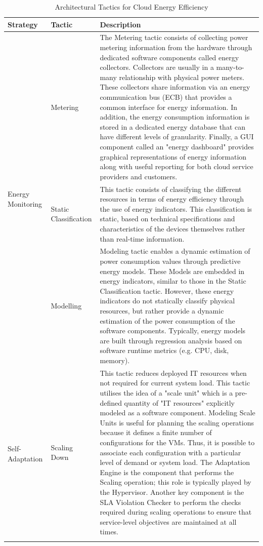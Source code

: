 \begin{small}
\begin{longtable}{| l | l | p{8cm} |}
\caption{Architectural Tactics for Cloud Energy Efficiency}
\label{table:cloudtactics}\\
\hline

\textbf{Strategy} & \textbf{Tactic} & \textbf{Description} \\
\hline

\multirow{3}{*}{Energy Monitoring} & Metering & The Metering tactic consists of collecting power metering information from the hardware through dedicated software components called energy collectors. Collectors are usually in a many-to-many relationship with physical power meters. These collectors share information via an energy communication bus (ECB) that provides a common interface for energy information. In addition, the energy consumption information is stored in a dedicated energy database that can have different levels of granularity. Finally, a GUI component called an "energy dashboard" provides graphical representations of energy information along with useful reporting for both cloud service providers and customers. \\ \cline{2-3}
& Static Classification & This tactic consists of classifying the different resources in terms of energy efficiency through the use of energy indicators. This classification is static, based on technical specifications and characteristics of the devices themselves rather than real-time information. \\ \cline{2-3}
& Modelling &  Modeling tactic enables a dynamic estimation of power consumption values through predictive energy models. These Models are embedded in energy indicators, similar to those in the Static Classification tactic. However, these energy indicators do not statically classify physical resources, but rather provide a dynamic estimation of the power consumption of the software components. Typically, energy models are built through regression analysis based on software runtime metrics (e.g. CPU, disk, memory). \\
\hline
\multirow{3}{*}{Self-Adaptation} & Scaling Down & This tactic reduces deployed IT resources when not required for current system load.  This tactic utilises the idea of a "scale unit" which is a pre-defined quantity of "IT resources" \cite{rogers2008-greenitpatterns} explicitly modeled as a software component. Modeling Scale Units is useful for planning the scaling operations because it defines a finite number of configurations for the VMs. Thus, it is possible to associate each configuration with a particular level of demand or system load. The Adaptation Engine is the component that performs the Scaling operation; this role is typically played by the Hypervisor. Another key component is the SLA Violation Checker to perform the checks required during scaling operations to ensure that service-level objectives are maintained at all times. \\ \cline{2-3}

\end{longtable}
\end{small}
